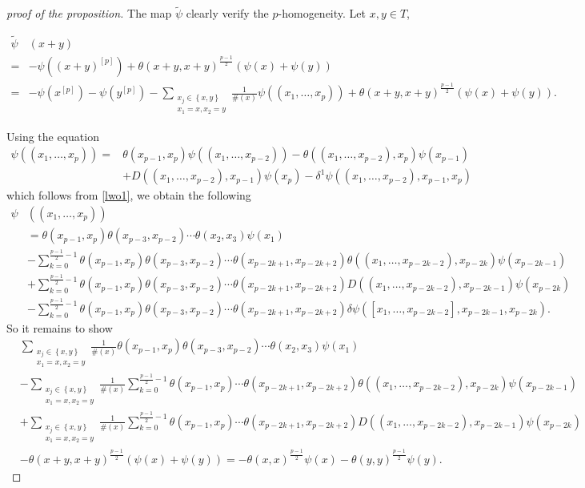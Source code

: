 \documentclass[11pt, twoside]{article}
\begin{document}
\begin{proof}[proof of the proposition]
The map $\tilde{\psi} $ clearly verify the $p$-homogeneity. Let $x,y\in T$, 

\begin{align*}
    \tilde{\psi}&(x+y)\\=& -\psi((x+y)^{[p]}) +\theta(x+y,x+y)^\frac{p-1}{2}(\psi(x)+\psi(y)) \\ =& -\psi(x^{[p]})- \psi(y^{[p]}) -  \sum_{\substack{x_j\in \left\{x,y \right\}\\x_1=x,x_2=y}}\frac{1}{\#(x)}\psi((x_1,\ldots,x_p)) + \theta(x+y,x+y)^\frac{p-1}{2}(\psi(x)+\psi(y)).
\end{align*}

Using the equation \begin{align*}
    \psi((x_1,\ldots,x_p))=&\theta(x_{p-1},x_p)\psi((x_1,\ldots,x_{p-2}))-\theta((x_1,\ldots,x_{p-2}),x_p)\psi(x_{p-1})\\ &+ D((x_1,\ldots,x_{p-2}),x_{p-1})\psi(x_p)-\delta^1\psi((x_1,\ldots,x_{p-2}),x_{p-1},x_p)
\end{align*} which follows from \eqref{lwo1}, we obtain the following \begin{align*}
    \psi&((x_1,\ldots,x_{p}))\\&=\theta(x_{p-1},x_p)\theta(x_{p-3},x_{p-2}) \cdots\theta(x_2,x_3)\psi(x_1) \\& -\sum\limits_{k=0}^{\frac{p-1}{2}-1}\theta(x_{p-1},x_p)\theta(x_{p-3},x_{p-2}) \cdots\theta(x_{p-2k+1},x_{p-2k+2})\theta((x_1,\ldots,x_{p-2k-2}),x_{p-2k})\psi(x_{p-2k-1}) \\ &+ \sum\limits_{k=0}^{\frac{p-1}{2}-1}\theta(x_{p-1},x_p)\theta(x_{p-3},x_{p-2})\cdots\theta(x_{p-2k+1},x_{p-2k+2})D((x_1,\ldots,x_{p-2k-2}),x_{p-2k-1})\psi(x_{p-2k}) \\ &- \sum\limits_{k=0}^{\frac{p-1}{2}-1}\theta(x_{p-1},x_p)\theta(x_{p-3},x_{p-2})\cdots\theta(x_{p-2k+1},x_{p-2k+2}) \delta\psi([x_1,\ldots,x_{p-2k-2}],x_{p-2k-1},x_{p-2k}) .
\end{align*} So it remains to show  \begin{align*} &\sum_{\substack{x_j\in \left\{x,y \right\}\\x_1=x,x_2=y}}\frac{1}{\#(x)}\theta(x_{p-1},x_p)\theta(x_{p-3},x_{p-2}) \cdots\theta(x_2,x_3)\psi(x_1) \\ 
     &- \sum_{\substack{x_j\in \left\{x,y \right\}\\x_1=x,x_2=y}}\frac{1}{\#(x)}\sum\limits_{k=0}^{\frac{p-1}{2}-1}\theta(x_{p-1},x_p)\cdots\theta(x_{p-2k+1},x_{p-2k+2})\theta((x_1,\ldots,x_{p-2k-2}),x_{p-2k})\psi(x_{p-2k-1}) \\ &+  \sum_{\substack{x_j\in \left\{x,y \right\}\\x_1=x,x_2=y}}\frac{1}{\#(x)}\sum\limits_{k=0}^{\frac{p-1}{2}-1}\theta(x_{p-1},x_p)\cdots\theta(x_{p-2k+1},x_{p-2k+2})D((x_1,\ldots,x_{p-2k-2}),x_{p-2k-1})\psi(x_{p-2k})\\ & -\theta(x+y,x+y)^{\frac{p-1}{2}}(\psi(x)+\psi(y)) = -\theta(x,x)^{\frac{p-1}{2}}\psi(x) -\theta(y,y)^{\frac{p-1}{2}}\psi(y).

\end{align*}
\end{proof}
\end{document}
